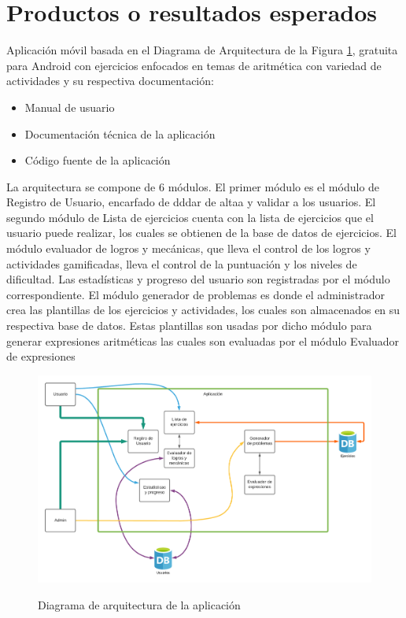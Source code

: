 \documentclass{article}
\begin{document}
\section{Productos o resultados esperados}
Aplicación móvil basada en el Diagrama de Arquitectura de la Figura \ref{fig:arquitectura}, 
gratuita para Android con ejercicios enfocados en temas de aritmética con variedad de 
actividades y su respectiva documentación:
\begin{itemize}
	\item Manual de usuario
	\item Documentación técnica de la aplicación
	\item Código fuente de la aplicación
\end{itemize}
La arquitectura se compone de 6 módulos. El primer módulo es el módulo de Registro de Usuario, encarfado de dddar de altaa y validar a los usuarios. El segundo módulo de Lista de ejercicios cuenta con la lista de ejercicios que el usuario puede realizar, los cuales se obtienen de la base de datos de ejercicios. El módulo evaluador de logros y mecánicas, que lleva el control de los logros y actividades gamificadas, lleva el control de la puntuación y los niveles de dificultad. Las estadísticas y progreso del usuario son registradas por el módulo correspondiente. El módulo generador de problemas es donde el administrador crea las plantillas de los ejercicios y actividades, los cuales son almacenados en su respectiva base de datos. Estas plantillas son usadas por dicho módulo para generar expresiones aritméticas las cuales son evaluadas por el módulo Evaluador de expresiones    
\begin{figure}[H]
\centering
\includegraphics[width=1\textwidth]{img/diagrama_arquitectura.png}\\
\caption{Diagrama de arquitectura de la aplicación}
\label{fig:arquitectura}
\end{figure}
\end{document}
